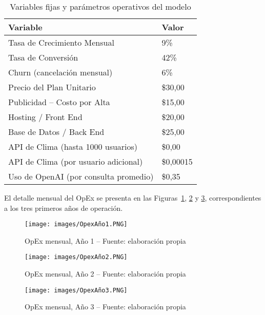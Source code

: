 \begin{table}[t]
    \centering
    \renewcommand{\arraystretch}{1.3}
    \caption{Variables fijas y parámetros operativos del modelo}
    \label{tab:variables_fijas}
    \begin{tabular}{|p{6cm}|p{3cm}|}
        \hline
        \textbf{Variable} & \textbf{Valor} \\
        \hline
        Tasa de Crecimiento Mensual & 9\% \\
        \hline
        Tasa de Conversión & 42\% \\
        \hline
        Churn (cancelación mensual) & 6\% \\
        \hline
        Precio del Plan Unitario & \$30,00 \\
        \hline
        Publicidad – Costo por Alta & \$15,00 \\
        \hline
        Hosting / Front End & \$20,00 \\
        \hline
        Base de Datos / Back End & \$25,00 \\
        \hline
        API de Clima (hasta 1000 usuarios) & \$0,00 \\
        \hline
        API de Clima (por usuario adicional) & \$0,00015 \\
        \hline
        Uso de OpenAI (por consulta promedio) & \$0,35 \\
        \hline
    \end{tabular}
\end{table}


El detalle mensual del OpEx se presenta en las Figuras~\ref{fig:opex-anio1}, \ref{fig:opex-anio2} y \ref{fig:opex-anio3}, correspondientes a los tres primeros años de operación.

\begin{figure}[!htbp]
  \centering
  \texttt{[image: images/OpexAño1.PNG]}
  \caption{OpEx mensual, Año 1 -- Fuente: elaboración propia}
  \label{fig:opex-anio1}
\end{figure}

\begin{figure}[!htbp]
  \centering
  \texttt{[image: images/OpexAño2.PNG]}
  \caption{OpEx mensual, Año 2 -- Fuente: elaboración propia}
  \label{fig:opex-anio2}
\end{figure}

\begin{figure}[!htbp]
  \centering
  \texttt{[image: images/OpexAño3.PNG]}
  \caption{OpEx mensual, Año 3 -- Fuente: elaboración propia}
  \label{fig:opex-anio3}
\end{figure}


